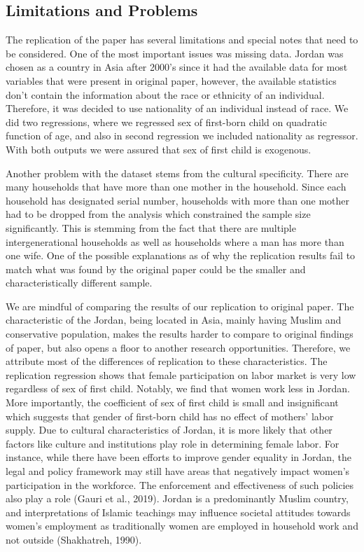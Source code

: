 \documentclass[12pt,draft,a4paper]{article}
\begin{document}
\subsection{Limitations and Problems}
The replication of the paper has several limitations and special notes that need to be considered.
One of the most important issues was missing data.
Jordan was chosen as a country in Asia after 2000's since it had the available data for most variables that were present in original paper, however, the available statistics don't contain the information about the race or ethnicity of an individual.
Therefore, it was decided to use nationality of an individual instead of race.
We did two regressions, where we regressed sex of first-born child on quadratic function of age, and also in second regression we included nationality as regressor. With both outputs we were assured that sex of first child is exogenous.

Another problem with the dataset stems from the cultural specificity. There are many households that have more than one mother in the household.
Since each household has designated serial number, households with more than one mother had to be dropped from the analysis which constrained the sample size significantly.
This is stemming from the fact that there are multiple intergenerational households as well as households where a man has more than one wife.
One of the possible explanations as of why the replication results fail to match what was found by the original paper could be the smaller and characteristically different sample.

We are mindful of comparing the results of our replication to original paper. 
The characteristic of the Jordan, being located in Asia, mainly having Muslim and conservative population, makes the results harder to compare to original findings of paper, but also opens a floor to another research opportunities.
Therefore, we attribute most of the differences of replication to these characteristics. 
The replication regression shows that female participation on labor market is very low regardless of sex of first child. 
Notably, we find that women work less in Jordan.
More importantly, the coefficient of sex of first child is small and insignificant which suggests that gender of first-born child has no effect of mothers' labor supply.
Due to cultural characteristics of Jordan, it is more likely that other factors like culture and institutions play role in determining female labor.
For instance, while there have been efforts to improve gender equality in Jordan, the legal and policy framework may still have areas that negatively impact women's participation in the workforce. The enforcement and effectiveness of such policies also play a role (Gauri et al., 2019).
Jordan is a predominantly Muslim country, and interpretations of Islamic teachings may influence societal attitudes towards women's employment as traditionally women are employed in household work and not outside (Shakhatreh, 1990). 
\end{document}
